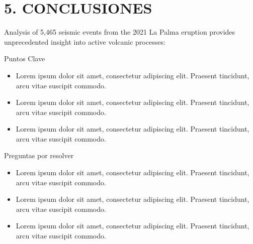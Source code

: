 \documentclass[
  spanish,
  letterpaper,
]{book}
\providecommand{\tightlist}{%
  \setlength{\itemsep}{0pt}\setlength{\parskip}{0pt}}
\begin{document}

\chapter{5. CONCLUSIONES}\label{conclusiones}

Analysis of 5,465 seismic events from the 2021 La Palma eruption
provides unprecedented insight into active volcanic processes:

\begin{tcolorbox}[enhanced jigsaw, colframe=quarto-callout-important-color-frame, rightrule=.15mm, toprule=.15mm, arc=.35mm, opacityback=0, leftrule=.75mm, breakable, left=2mm, bottomrule=.15mm, colback=white]

Puntos Clave

\begin{itemize}
\tightlist
\item
  Lorem ipsum dolor sit amet, consectetur adipiscing elit. Praesent
  tincidunt, arcu vitae suscipit commodo.
\item
  Lorem ipsum dolor sit amet, consectetur adipiscing elit. Praesent
  tincidunt, arcu vitae suscipit commodo.
\item
  Lorem ipsum dolor sit amet, consectetur adipiscing elit. Praesent
  tincidunt, arcu vitae suscipit commodo.
\end{itemize}

\end{tcolorbox}

\begin{tcolorbox}[enhanced jigsaw, colframe=quarto-callout-important-color-frame, rightrule=.15mm, toprule=.15mm, arc=.35mm, opacityback=0, leftrule=.75mm, breakable, left=2mm, bottomrule=.15mm, colback=white]

Preguntas por resolver

\begin{itemize}
\tightlist
\item
  Lorem ipsum dolor sit amet, consectetur adipiscing elit. Praesent
  tincidunt, arcu vitae suscipit commodo.
\item
  Lorem ipsum dolor sit amet, consectetur adipiscing elit. Praesent
  tincidunt, arcu vitae suscipit commodo.
\item
  Lorem ipsum dolor sit amet, consectetur adipiscing elit. Praesent
  tincidunt, arcu vitae suscipit commodo.
\end{itemize}

\end{tcolorbox}
\end{document}
